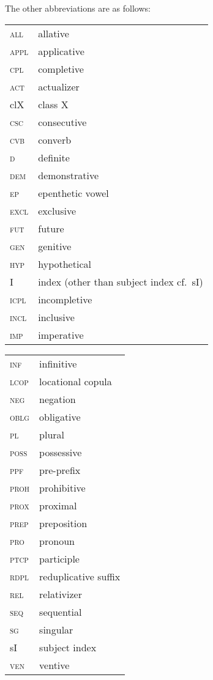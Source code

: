\documentclass[output=paper]{langscibook}
\begin{document}
The other abbreviations are as follows:

\begin{center}
  \begin{tabularx}{.45\textwidth}[t]{lQ}
    \textsc{all}  & allative \\
    \textsc{appl} & applicative \\
    \textsc{cpl}  & completive \\
    \textsc{act}  & actualizer \\
    clX           & class X \\
    \textsc{csc}  & consecutive \\
    \textsc{cvb}  & converb \\
    \textsc{d}    & definite \\
    \textsc{dem}  & demonstrative \\
    \textsc{ep}   & epenthetic vowel \\
    \textsc{excl} & exclusive \\
    \textsc{fut}  & future \\
    \textsc{gen}  & genitive \\
    \textsc{hyp}  & hypothetical \\
    I             & index (other than subject index cf.\ sI) \\
    \textsc{icpl} & incompletive \\
    \textsc{incl} & inclusive \\
    \textsc{imp}  & imperative \\
  \end{tabularx}
  \begin{tabularx}{.45\textwidth}[t]{lQ}
    \textsc{inf}  & infinitive \\
    \textsc{lcop} & locational copula \\
    \textsc{neg}  & negation \\
    \textsc{oblg} & obligative \\
    \textsc{pl}   & plural \\
    \textsc{poss} & possessive \\
    \textsc{ppf}  & pre-prefix \\
    \textsc{proh} & prohibitive \\
    \textsc{prox} & proximal \\
    \textsc{prep} & preposition \\
    \textsc{pro}  & pronoun \\
    \textsc{ptcp} & participle \\
    \textsc{rdpl} & reduplicative suffix \\
    \textsc{rel}  & relativizer \\
    \textsc{seq}  & sequential \\
    \textsc{sg}   & singular \\
    sI            & subject index \\
    \textsc{ven}  & ventive \\
  \end{tabularx}
\end{center}

{\sloppy\printbibliography[heading=subbibliography,notkeyword=this]}
\end{document}
